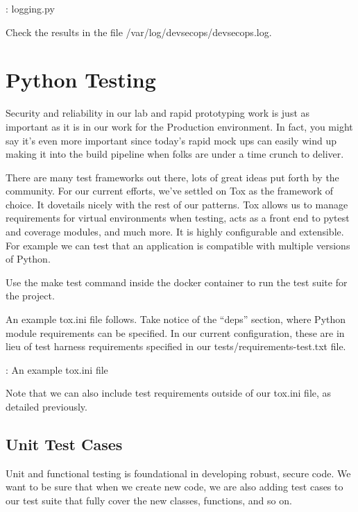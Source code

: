 \begin{mybox}{\thetcbcounter: logging.py}
    
\end{mybox}

\justifying
Check the results in the file /var/log/devsecops/devsecops.log.

\section{Python Testing}

\justifying
Security and reliability in our lab and rapid prototyping work is just as important as it is in our work for the Production environment. In fact, you might say it's even more important since today's rapid mock ups
can easily wind up making it into the build pipeline when folks are under a time crunch to deliver.

\justifying
There are many test frameworks out there, lots of great ideas put forth by the community. For our current
efforts, we've settled on Tox as the framework of choice. It dovetails nicely with the rest of
our patterns. Tox allows us to manage requirements for virtual environments when testing, acts as a front
end to pytest and coverage modules, and much more. It is highly configurable and extensible. For example
we can test that an application is compatible with multiple versions of Python.

\justifying
Use the make test command inside the docker container to run the test suite for the project.

\justifying
An example tox.ini file follows. Take notice of the ``deps'' section, where Python module
requirements can be specified. In our current configuration, these are in lieu of test harness requirements specified in our tests/requirements-test.txt file.

\begin{mybox}{\thetcbcounter: An example tox.ini file}
	
\end{mybox}

\justifying
Note that we can also include test requirements outside of our tox.ini file, as detailed previously.

\subsection{Unit Test Cases}

\justifying
Unit and functional testing is foundational in developing robust, secure code. We want to be sure that when we
create new code, we are also adding test cases to our test suite that fully cover the new classes, functions,
and so on.


